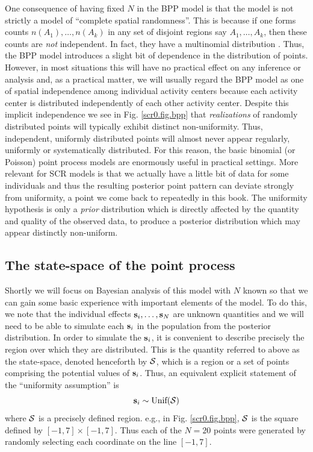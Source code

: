 One consequence of having fixed $N$ in the BPP model is that the
model is not strictly a model of ``complete spatial randomness''. This
is because if one forms counts $n(A_{1}),\ldots, n(A_{k})$ in any set
of disjoint regions say $A_{1}, \ldots, A_{k}$, then these counts are
{\it not} independent.  In fact, they have a multinomial distribution
\citep[see][p. 61]{illian_etal:2008}. Thus, the BPP model introduces
a slight bit of dependence in the distribution of points. However, in
most situations this will have no practical effect on any inference or
analysis and, as a practical matter, we will usually regard the BPP
model as one of spatial independence among individual activity centers
because each activity center is distributed independently of each
other activity center. Despite this implicit independence we see in
Fig. \ref{scr0.fig.bpp} that {\it realizations} of randomly distributed
points will typically exhibit distinct non-uniformity. Thus,
independent, uniformly distributed points will almost never appear
regularly, uniformly or systematically distributed. For this reason,
the basic binomial (or Poisson) point process models are enormously
useful in practical settings.  More relevant for SCR models is that we
actually have a little bit of data for some individuals and thus the
resulting posterior point pattern can deviate strongly from
uniformity, a point we come back to repeatedly in this book.
The uniformity hypothesis is only
a {\it prior} distribution which is directly affected by the quantity
and quality of the observed data, to produce a posterior distribution which
may appear distinctly non-uniform.


\subsection{The state-space of the point process}

Shortly we will focus on Bayesian analysis of this model with $N$
known so that we can gain some basic experience with important
elements of the model.
 To do this, we note that the individual
effects ${\bf s}_{i},\ldots, {\bf s}_{N}$ are unknown quantities and
we will need to be able to simulate each ${\bf s}_{i}$ in the
population from the posterior distribution.  In order to simulate
the ${\bf s}_{i}$, it is convenient to describe precisely
the region over which they are distributed. This is the
quantity referred to above as the state-space, denoted henceforth by
${\cal S}$, which is a region or a set of points comprising the
potential values of ${\bf s}_{i}$. Thus, an equivalent explicit
statement of the ``uniformity assumption'' is
\[
{\bf s}_{i} \sim \mbox{Unif}({\cal S})
\]
where ${\cal S}$ is a precisely defined region. e.g., in Fig. 
\ref{scr0.fig.bpp}, ${\cal S}$ is the square defined by $[-1,7] \times
[-1, 7]$. Thus each of the $N=20$ points were generated by randomly
selecting each coordinate on the line $[-1, 7]$. 


